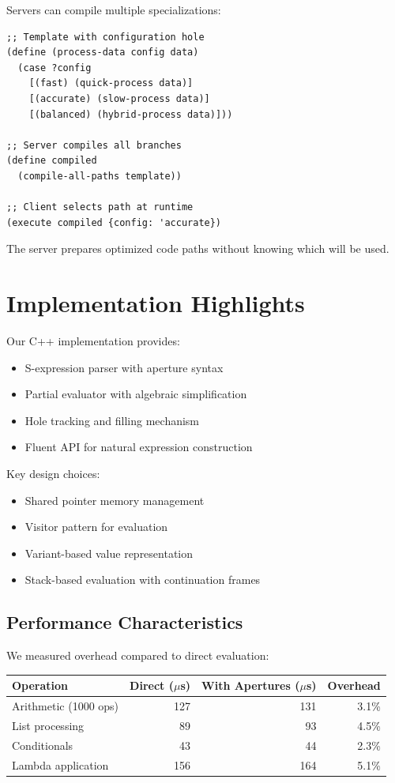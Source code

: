 \documentclass[10pt]{article}
\begin{document}
Servers can compile multiple specializations:

\begin{lstlisting}
;; Template with configuration hole
(define (process-data config data)
  (case ?config
    [(fast) (quick-process data)]
    [(accurate) (slow-process data)]
    [(balanced) (hybrid-process data)]))

;; Server compiles all branches
(define compiled
  (compile-all-paths template))

;; Client selects path at runtime
(execute compiled {config: 'accurate})
\end{lstlisting}

The server prepares optimized code paths without knowing which will be used.

\section{Implementation Highlights}

Our C++ implementation provides:
\begin{itemize}
\item S-expression parser with aperture syntax
\item Partial evaluator with algebraic simplification
\item Hole tracking and filling mechanism
\item Fluent API for natural expression construction
\end{itemize}

Key design choices:
\begin{itemize}
\item Shared pointer memory management
\item Visitor pattern for evaluation
\item Variant-based value representation
\item Stack-based evaluation with continuation frames
\end{itemize}

\subsection{Performance Characteristics}

We measured overhead compared to direct evaluation:

\begin{center}
\begin{tabular}{lrrr}
\toprule
Operation & Direct ($\mu$s) & With Apertures ($\mu$s) & Overhead \\
\midrule
Arithmetic (1000 ops) & 127 & 131 & 3.1\% \\
List processing & 89 & 93 & 4.5\% \\
Conditionals & 43 & 44 & 2.3\% \\
Lambda application & 156 & 164 & 5.1\% \\
\bottomrule
\end{tabular}
\end{center}
\end{document}
